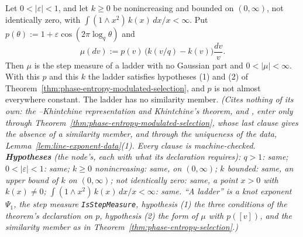 \begin{proposition}
\label{prop:modulated-selection-strict}
\leanok
{}
Let $0 < |\varepsilon| < 1$, and let $k \ge 0$ be nonincreasing and bounded on $(0,\infty)$, not
identically zero, with $\int(1 \wedge x^2)\,k(x)\,dx/x < \infty$. Put
$p(\theta) := 1 + \varepsilon\cos(2\pi\log_q\theta)$ and
\[
  \mu(dv) := p(v)\,\bigl(k(v/q) - k(v)\bigr)\frac{dv}{v} .
\]
Then $\mu$ is the step measure of a ladder with no Gaussian part and $0 < |\mu| < \infty$. With
this $p$ and this $k$ the ladder satisfies hypotheses (1) and (2) of
Theorem~\ref{thm:phase-entropy-modulated-selection}, and $p$ is not almost everywhere constant. The
ladder has no similarity member.
\statusT\quad\emph{(Cites nothing of its own: the \Levy{}--Khintchine representation and
Khintchine's theorem,  and , enter only through
Theorem~\ref{thm:phase-entropy-modulated-selection}, whose last clause gives the absence of a
similarity member, and through the uniqueness of the data, Lemma~\ref{lem:line-exponent-data}(1).
Every clause is machine-checked. \textbf{Hypotheses} (the node's, each with what its declaration
requires): $q > 1$: same; $0 < |\varepsilon| < 1$: same; $k \ge 0$ nonincreasing: same, on
$(0,\infty)$; $k$ bounded: same, an upper bound of $k$ on $(0,\infty)$; not identically zero:
same, a point $x > 0$ with $k(x) \ne 0$; $\int(1 \wedge x^2)\,k(x)\,dx/x < \infty$: same. ``A
ladder'' is a knot exponent $\Psi_1$, the step measure \texttt{IsStepMeasure}, hypothesis (1) the
three conditions of the theorem's declaration on $p$, hypothesis (2) the form of $\mu$ with
$p([v])$, and the similarity member as in Theorem~\ref{thm:phase-entropy-selection}.)}
\end{proposition}

